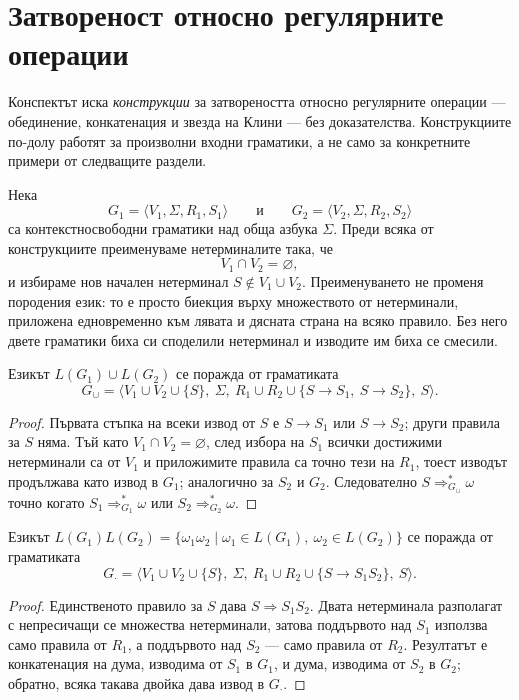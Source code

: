 \section{Затвореност относно регулярните операции}\label{s:5.4}

Конспектът иска \emph{конструкции} за затвореността относно регулярните
операции --- обединение, конкатенация и звезда на Клини --- без доказателства.
Конструкциите по-долу работят за произволни входни граматики, а не само за
конкретните примери от следващите раздели.

Нека
\[
G_1=\langle V_1,\Sigma,R_1,S_1\rangle
\qquad\text{и}\qquad
G_2=\langle V_2,\Sigma,R_2,S_2\rangle
\]
са контекстносвободни граматики над обща азбука $\Sigma$. Преди всяка от
конструкциите преименуваме нетерминалите така, че
\[
V_1\cap V_2=\varnothing,
\]
и избираме нов начален нетерминал $S\notin V_1\cup V_2$. Преименуването не
променя породения език: то е просто биекция върху множеството от нетерминали,
приложена едновременно към лявата и дясната страна на всяко правило. Без него
двете граматики биха си споделили нетерминал и изводите им биха се смесили.

\begin{prop}
Езикът $L(G_1)\cup L(G_2)$ се поражда от граматиката
\[
G_\cup=\langle V_1\cup V_2\cup\{S\},\ \Sigma,\ R_1\cup R_2\cup\{S\to S_1,\ S\to S_2\},\ S\rangle .
\]
\end{prop}
\begin{proof}
Първата стъпка на всеки извод от $S$ е $S\to S_1$ или $S\to S_2$; други правила
за $S$ няма. Тъй като $V_1\cap V_2=\varnothing$, след избора на $S_1$ всички
достижими нетерминали са от $V_1$ и приложимите правила са точно тези на $R_1$,
тоест изводът продължава като извод в $G_1$; аналогично за $S_2$ и $G_2$.
Следователно $S\Rightarrow^*_{G_\cup}\omega$ точно когато $S_1\Rightarrow^*_{G_1}\omega$
или $S_2\Rightarrow^*_{G_2}\omega$.
\end{proof}

\begin{prop}
Езикът $L(G_1)L(G_2)=\{\omega_1\omega_2\mid \omega_1\in L(G_1),\ \omega_2\in L(G_2)\}$
се поражда от граматиката
\[
G_\cdot=\langle V_1\cup V_2\cup\{S\},\ \Sigma,\ R_1\cup R_2\cup\{S\to S_1S_2\},\ S\rangle .
\]
\end{prop}
\begin{proof}
Единственото правило за $S$ дава $S\Rightarrow S_1S_2$. Двата нетерминала
разполагат с непресичащи се множества нетерминали, затова поддървото над $S_1$
използва само правила от $R_1$, а поддървото над $S_2$ --- само правила от $R_2$.
Резултатът е конкатенация на дума, изводима от $S_1$ в $G_1$, и дума, изводима
от $S_2$ в $G_2$; обратно, всяка такава двойка дава извод в $G_\cdot$.
\end{proof}


